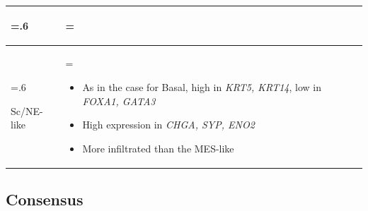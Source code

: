 \begin{appendices}
\begin{table}[H]
\begin{tabularx}{\textwidth}{>{\hsize=.6\hsize\raggedright\arraybackslash}X >{\hsize=\hsize\arraybackslash}X}
\begin{itemize}[leftmargin=*, nosep, after=\vspace{-\baselineskip}]
    \end{itemize} \\
    \midrule
    Sc/NE-like & 
    \begin{itemize}[leftmargin=*, nosep, after=\vspace{-\baselineskip}]
        \item As in the case for Basal, high in \textit{KRT5, KRT14}, low in \textit{FOXA1, GATA3}
        \item High expression in\textit{ CHGA, SYP, ENO2}
        \item More infiltrated than the MES-like
    \end{itemize} \\
    \bottomrule
    \end{tabularx}
    \label{tab:lit:lund_genes}
\end{table}



\subsection{Consensus}



\end{appendices}
